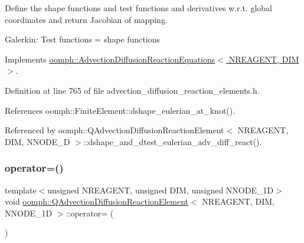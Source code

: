 Define the shape functions and test functions and derivatives w.\+r.\+t. global coordinates and return Jacobian of mapping.

Galerkin\+: Test functions = shape functions 

Implements \hyperlink{classoomph_1_1AdvectionDiffusionReactionEquations_acd01ced36610cb5e69ee359df778ba09}{oomph\+::\+Advection\+Diffusion\+Reaction\+Equations$<$ N\+R\+E\+A\+G\+E\+N\+T, D\+I\+M $>$}.



Definition at line 765 of file advection\+\_\+diffusion\+\_\+reaction\+\_\+elements.\+h.



References oomph\+::\+Finite\+Element\+::dshape\+\_\+eulerian\+\_\+at\+\_\+knot().



Referenced by oomph\+::\+Q\+Advection\+Diffusion\+Reaction\+Element$<$ N\+R\+E\+A\+G\+E\+N\+T, D\+I\+M, N\+N\+O\+D\+E\+\_\+D $>$\+::dshape\+\_\+and\+\_\+dtest\+\_\+eulerian\+\_\+adv\+\_\+diff\+\_\+react().

\mbox{\label{classoomph_1_1QAdvectionDiffusionReactionElement_a0c4f00cf6b1cd8a0bb0ec505ed319807}} 
\subsubsection{\texorpdfstring{operator=()}{operator=()}}
{\footnotesize\ttfamily template$<$unsigned N\+R\+E\+A\+G\+E\+NT, unsigned D\+IM, unsigned N\+N\+O\+D\+E\+\_\+1D$>$ \\
void \hyperlink{classoomph_1_1QAdvectionDiffusionReactionElement}{oomph\+::\+Q\+Advection\+Diffusion\+Reaction\+Element}$<$ N\+R\+E\+A\+G\+E\+NT, D\+IM, N\+N\+O\+D\+E\+\_\+1D $>$\+::operator= (\begin{DoxyParamCaption}\item[{const \hyperlink{classoomph_1_1QAdvectionDiffusionReactionElement}{Q\+Advection\+Diffusion\+Reaction\+Element}$<$ N\+R\+E\+A\+G\+E\+NT, D\+IM, N\+N\+O\+D\+E\+\_\+1D $>$ \&}]{ }\end{DoxyParamCaption})\hspace{0.3cm}{\ttfamily [inline]}}



